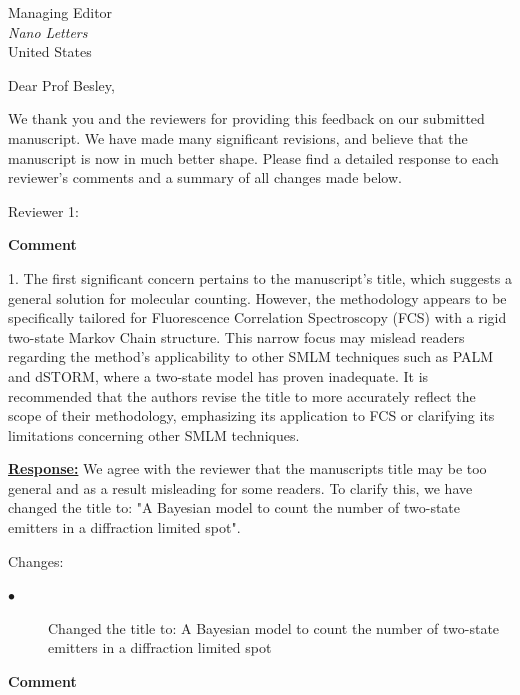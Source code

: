 \documentclass{article}
\date{\today}
\begin{document}
\thispagestyle{empty}
Managing Editor\\
\textit{Nano Letters}\\
United States\\

\vspace{5mm}

Dear Prof Besley, 

We thank you and the reviewers for providing this feedback on our submitted manuscript. We have made many significant revisions, 
and believe that the manuscript is now in much better shape. Please find a detailed response to each reviewer's comments and a summary 
of all changes made below.


Reviewer 1:

\textbf{Comment}

1.	The first significant concern pertains to the manuscript's title, 
which suggests a general solution for molecular counting. 
However, the methodology appears to be specifically tailored for Fluorescence Correlation Spectroscopy 
(FCS) with a rigid two-state Markov Chain structure. 
This narrow focus may mislead readers regarding the method's applicability to other SMLM 
techniques such as PALM and dSTORM, where a two-state model has proven inadequate. 
It is recommended that the authors revise the title to more accurately reflect the scope of 
their methodology, emphasizing its application to FCS or clarifying its limitations concerning other SMLM techniques.

\underline{\textbf{Response:}}
We agree with the reviewer that the manuscripts title may be too general and as a result misleading for some readers.
To clarify this, we have changed the title to: "A Bayesian model to count the number of two-state emitters in a 
diffraction limited spot". 

Changes:
\begin{description}
    \item[$\bullet$] Changed the title to: A Bayesian model to count the number of two-state emitters in a diffraction limited spot
\end{description}

\textbf{Comment}
\end{document}
